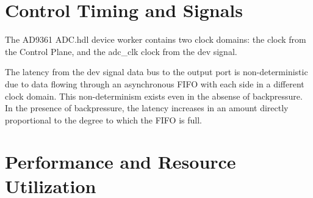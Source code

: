\documentclass{article}
\def\Comp{AD9361 ADC}
\begin{document}
\section*{Control Timing and Signals}
The \Comp{}.hdl device worker contains two clock domains: the clock from the Control Plane, and the adc\_clk clock from the dev signal.\par\bigskip
\noindent The latency from the dev signal data bus to the output port is non-deterministic due to data flowing through an asynchronous FIFO with each side in a different clock domain. This non-determinism exists even in the absense of backpressure. In the presence of backpressure, the latency increases in an amount directly proportional to the degree to which the FIFO is full.

\section*{Performance and Resource Utilization}
\end{document}
